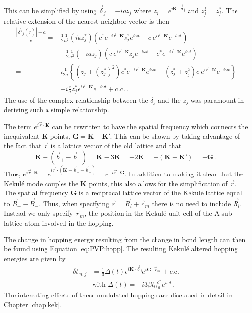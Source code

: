 This can be simplified by using $\vec{\delta}_j=-i a z_j$ where $z_j= e^{i \bm{K} \cdot \vec{\delta}_j}$ and $z_j^2=z_j^*$.
The relative extension of the nearest neighbor vector is then
\begin{align*}
	\frac{|\vec{\delta}'_j(\vec{r})|-a}{a}=&
		\frac{1}{2} \frac{1}{a^2} (i a z_j^*) 
		\left( c^* e^{-i\vec{r} \cdot \bm{K}} z_j^* e^{i \omega t} - c \ e^{i\vec{r} \cdot \bm{K}} e^{-i \omega t} \right) \\
	&+\frac{1}{2}\frac{1}{a^2} (-ia z_j)
		\left( c \ e^{i\vec{r} \cdot \bm{K}} z_j e^{-i \omega t} - c^* e^{-i\vec{r} \cdot \bm{K}} e^{i \omega t} \right) \\
	=&i \frac{1}{2a} \left\{
		(z_j+(z_j^*)^2) c^* e^{-i\vec{r} \cdot \bm{K}} e^{i \omega t}
		-(z_j^*+z_j^2)c \ e^{i\vec{r} \cdot \bm{K}} e^{-i \omega t}
		\right\} \\
	=&-i \frac{c}{a} z_j^* e^{i\vec{r} \cdot \bm{K}} e^{-i \omega t} + \text{c.c.} \ .
\end{align*}
The use of the complex relationship between the $\delta_j$ and the $z_j$ was paramount in deriving such a simple relationship.

The term $e^{i \vec{r} \cdot \bm{K}}$ can be rewritten to have the spatial frequency which connects the inequivalent $\bm{K}$ points, $\bm{G}=\bm{K}-\bm{K'}$.
This can be shown by taking advantage of the fact that $\vec{r}$ is a lattice vector of the old lattice and that
\begin{equation*}
	\bm{K}-(\vec{b}_+-\vec{b}_-)=\bm{K}-3 \bm{K}=-2 \bm{K}=-(\bm{K}-\bm{K'})=-\bm{G} \ .
\end{equation*} 
Thus, $e^{i \vec{r}\cdot \bm{K}}=e^{i\vec{r}\cdot(\bm{K} - \vec{b}_+-\vec{b}_-)}= e^{-i \vec{r} \cdot \bm{G}}$.
In addition to making it clear that the Kekul\'e mode couples the $\bm{K}$ points, this also allows for the simplification of $\vec{r}$.
The spatial frequency $\bm{G}$ is a reciprocal lattice vector of the Kekul\'e lattice equal to $\vec{B}_+ - \vec{B}_-$.
Thus, when specifying $\vec{r}=\vec{R}_l+\vec{r}_m$ there is no need to include $\vec{R}_l$.
Instead we only specify $\vec{r}_m$, the position in the Kekul\'e unit cell of the A sub-lattice atom involved in the hopping.

The change in hopping energy resulting from the change in bond length can then be found using Equation \ref{eq:PVP:hopp}.
The resulting Kekul\'e altered hopping energies are given by
\begin{align*}
	\delta t_{m,j}&=\frac{1}{3} \Delta(t) e^{i \bm{K} \cdot \vec{\delta}_j} e^{i \bm{G} \cdot \vec{r}_m}+\text{c.c.} \nonumber \\
	& \text{with } \Delta(t)=-i 3 \beta t_0 \frac{c^*}{a} e^{i \omega t} \ .
\end{align*}
The interesting effects of these modulated hoppings are discussed in detail in Chapter \ref{chap:kek}.